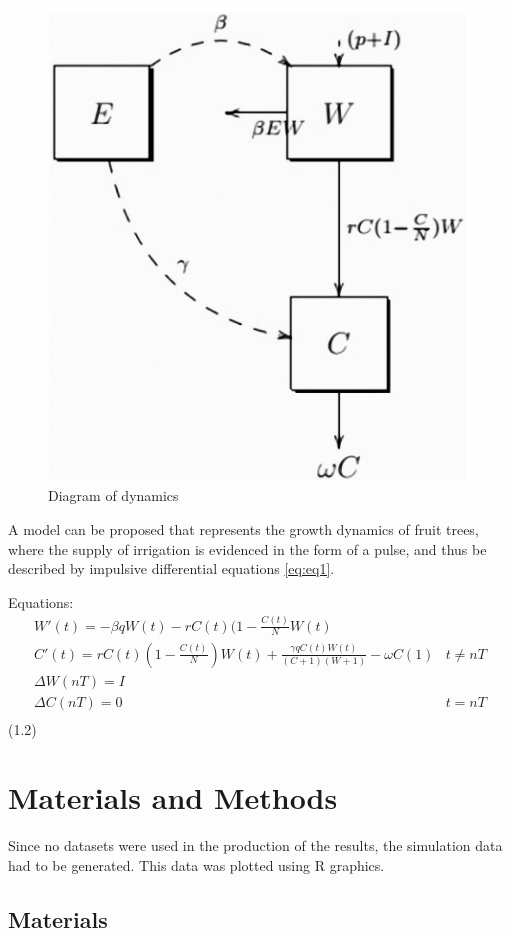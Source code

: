 \documentclass[
]{article}
\begin{document}
\begin{figure}

{\centering \includegraphics[width=0.5\linewidth]{dynamics} 

}

\caption{\label{fig:fig1}Diagram of dynamics}\label{fig:unnamed-chunk-1}
\end{figure}

A model can be proposed that represents the growth dynamics of fruit
trees, where the supply of irrigation is evidenced in the form of a
pulse, and thus be described by impulsive differential equations
\ref{eq:eq1}.

Equations: \[
  \begin{array}{cc}
  W'(t) = -\beta qW(t) - rC(t)(1 - \frac{C(t)}{N} W(t) & \\
  C'(t) = rC(t)(1 - \frac{C(t)}{N})W(t) + \frac{\gamma qC(t)W(t)}{(C+1)(W+1)}-\omega C(1) & t \ne nT\\
  \Delta W(nT) = I & \\
  \Delta C(nT) = 0 & t = nT\\
  \end{array}
\] \hfill (\label{eq:eq1}1.2)

\newpage

\hypertarget{materials-and-methods}{%
\section{Materials and Methods}\label{materials-and-methods}}

Since no datasets were used in the production of the results, the
simulation data had to be generated. This data was plotted using R
graphics.

\hypertarget{materials}{%
\subsection{Materials}\label{materials}}
\end{document}
